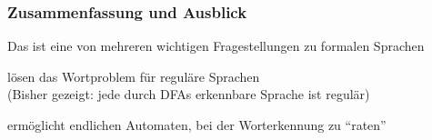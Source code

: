 \documentclass[onlymath]{beamer}
\begin{document}
\begin{frame}\frametitle{Zusammenfassung und Ausblick}

Das  ist eine von mehreren wichtigen Fragestellungen zu formalen Sprachen
\bigskip

 lösen das Wortproblem für reguläre Sprachen\\
\textcolor{devilscss}{(Bisher gezeigt: jede durch DFAs erkennbare Sprache ist regulär)}
\bigskip

 ermöglicht endlichen Automaten, bei der Worterkennung zu "`raten"'
\bigskip


\end{frame}
% 
\end{document}
